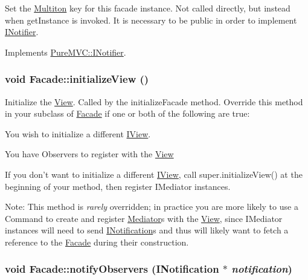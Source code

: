 Set the \hyperlink{class_pure_m_v_c_1_1_multiton}{Multiton} key for this facade instance. Not called directly, but instead when getInstance is invoked. It is necessary to be public in order to implement \hyperlink{class_pure_m_v_c_1_1_i_notifier}{INotifier}. 

Implements \hyperlink{class_pure_m_v_c_1_1_i_notifier_a28d7dbbe0726d4d52080546c5d79b232}{PureMVC::INotifier}.\hypertarget{class_pure_m_v_c_1_1_facade_a62c7ff60891c00e2271a9ab5ab3640ab}{
\subsubsection[{initializeView}]{\setlength{\rightskip}{0pt plus 5cm}void Facade::initializeView ()}}
\label{class_pure_m_v_c_1_1_facade_a62c7ff60891c00e2271a9ab5ab3640ab}


Initialize the {\ttfamily \hyperlink{class_pure_m_v_c_1_1_view}{View}}. Called by the {\ttfamily initializeFacade} method. Override this method in your subclass of {\ttfamily \hyperlink{class_pure_m_v_c_1_1_facade}{Facade}} if one or both of the following are true: 
\begin{DoxyItemize}
\item You wish to initialize a different {\ttfamily \hyperlink{class_pure_m_v_c_1_1_i_view}{IView}}. 
\item You have {\ttfamily Observers} to register with the {\ttfamily \hyperlink{class_pure_m_v_c_1_1_view}{View}} 
\end{DoxyItemize}If you don't want to initialize a different {\ttfamily \hyperlink{class_pure_m_v_c_1_1_i_view}{IView}}, call {\ttfamily super.initializeView()} at the beginning of your method, then register {\ttfamily IMediator} instances. 

Note: This method is {\itshape rarely\/} overridden; in practice you are more likely to use a {\ttfamily Command} to create and register {\ttfamily \hyperlink{class_pure_m_v_c_1_1_mediator}{Mediator}}s with the {\ttfamily \hyperlink{class_pure_m_v_c_1_1_view}{View}}, since {\ttfamily IMediator} instances will need to send {\ttfamily \hyperlink{class_pure_m_v_c_1_1_i_notification}{INotification}}s and thus will likely want to fetch a reference to the {\ttfamily \hyperlink{class_pure_m_v_c_1_1_facade}{Facade}} during their construction.  \hypertarget{class_pure_m_v_c_1_1_facade_a605e0e774d8d4d9b31fcb040a14fec77}{
\subsubsection[{notifyObservers}]{\setlength{\rightskip}{0pt plus 5cm}void Facade::notifyObservers ({\bf INotification} $\ast$ {\em notification})}}
\label{class_pure_m_v_c_1_1_facade_a605e0e774d8d4d9b31fcb040a14fec77}



